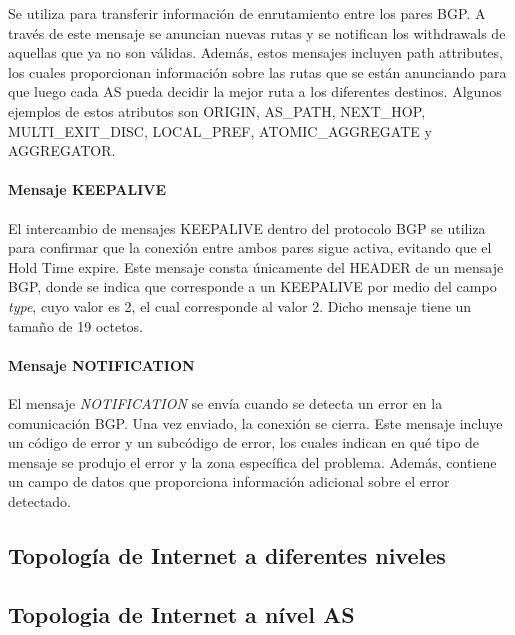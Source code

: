 Se utiliza para transferir información de enrutamiento entre los pares BGP. A través de este mensaje se anuncian nuevas rutas y se notifican los withdrawals de aquellas que ya no son válidas.
Además, estos mensajes incluyen path attributes, los cuales proporcionan información sobre las rutas que se están anunciando para que luego cada AS pueda decidir la mejor ruta a los diferentes destinos. Algunos ejemplos de estos atributos son ORIGIN, AS\_PATH, NEXT\_HOP, MULTI\_EXIT\_DISC, LOCAL\_PREF, ATOMIC\_AGGREGATE y AGGREGATOR.\\



\paragraph{Mensaje KEEPALIVE} 

El intercambio de mensajes KEEPALIVE dentro del protocolo BGP se utiliza para confirmar que la conexión entre ambos pares sigue activa, evitando que el Hold Time expire.
Este mensaje consta únicamente del HEADER de un mensaje BGP, donde se indica que corresponde a un KEEPALIVE por medio del campo \textit{type}, cuyo valor es 2, el cual corresponde al valor 2. Dicho mensaje tiene un tamaño de 19 octetos.\\


\paragraph{Mensaje NOTIFICATION}

El mensaje \textit{NOTIFICATION} se envía cuando se detecta un error en la comunicación BGP. Una vez enviado, la conexión se cierra.
Este mensaje incluye un código de error y un subcódigo de error, los cuales indican en qué tipo de mensaje se produjo el error y la zona específica del problema. Además, contiene un campo de datos que proporciona información adicional sobre el error detectado.\\

\subsection{Topología de Internet a diferentes niveles}\label{}
\subsection{Topologia de Internet a nível AS} \label{sec:anexo_topologia_internet_as}

